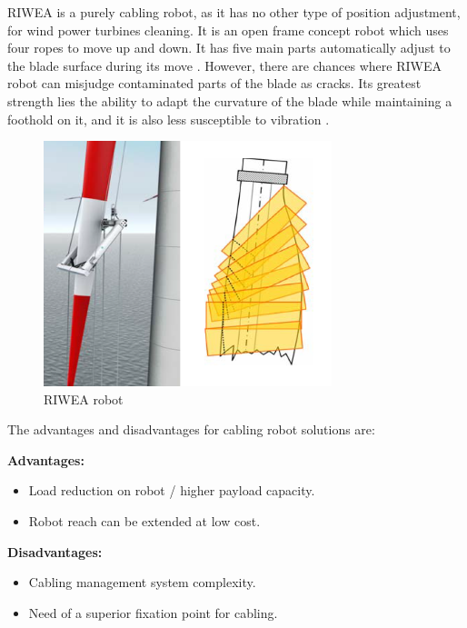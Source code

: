 RIWEA is a purely cabling robot, as it has no other type of position
adjustment, for wind power turbines cleaning. It is an open frame concept robot
which uses four ropes to move up and down. It has five main parts automatically
adjust to the blade surface during its move \citep{jeon2012maintenance}.
However, there are chances where RIWEA robot can misjudge contaminated parts of
the blade as cracks. Its greatest strength lies the ability to adapt the
curvature of the blade while maintaining a foothold on it, and it is also less
susceptible to vibration \citep{riwea}.

\begin{figure}[!h]
	\centering
	\includegraphics[width=8.4cm]{figs/cables/riwea}
	\caption{RIWEA robot}
	\label{fig:cables:riwea}
\end{figure}

The advantages and disadvantages for cabling robot solutions are:

\textbf{Advantages:}
\begin{itemize}
  \item Load reduction on robot / higher payload capacity.
  \item Robot reach can be extended at low cost.
\end{itemize}

\textbf{Disadvantages:}
\begin{itemize}
  \item Cabling management system complexity.
  \item Need of a superior fixation point for cabling.
\end{itemize}


